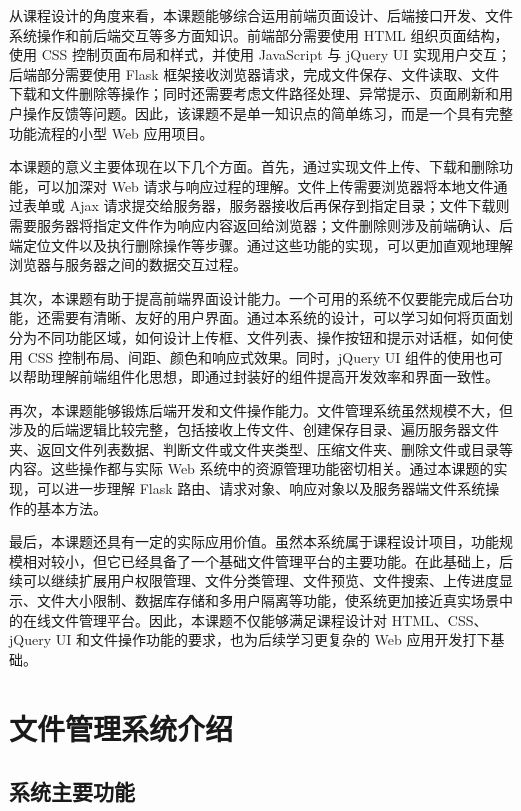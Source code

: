 \documentclass[UTF8,zihao=-4]{ctexrep}
\begin{document}
从课程设计的角度来看，本课题能够综合运用前端页面设计、后端接口开发、文件系统操作和前后端交互等多方面知识。前端部分需要使用 HTML 组织页面结构，使用 CSS 控制页面布局和样式，并使用 JavaScript 与 jQuery UI 实现用户交互；后端部分需要使用 Flask 框架接收浏览器请求，完成文件保存、文件读取、文件下载和文件删除等操作；同时还需要考虑文件路径处理、异常提示、页面刷新和用户操作反馈等问题。因此，该课题不是单一知识点的简单练习，而是一个具有完整功能流程的小型 Web 应用项目。

本课题的意义主要体现在以下几个方面。首先，通过实现文件上传、下载和删除功能，可以加深对 Web 请求与响应过程的理解。文件上传需要浏览器将本地文件通过表单或 Ajax 请求提交给服务器，服务器接收后再保存到指定目录；文件下载则需要服务器将指定文件作为响应内容返回给浏览器；文件删除则涉及前端确认、后端定位文件以及执行删除操作等步骤。通过这些功能的实现，可以更加直观地理解浏览器与服务器之间的数据交互过程。

其次，本课题有助于提高前端界面设计能力。一个可用的系统不仅要能完成后台功能，还需要有清晰、友好的用户界面。通过本系统的设计，可以学习如何将页面划分为不同功能区域，如何设计上传框、文件列表、操作按钮和提示对话框，如何使用 CSS 控制布局、间距、颜色和响应式效果。同时，jQuery UI 组件的使用也可以帮助理解前端组件化思想，即通过封装好的组件提高开发效率和界面一致性。

再次，本课题能够锻炼后端开发和文件操作能力。文件管理系统虽然规模不大，但涉及的后端逻辑比较完整，包括接收上传文件、创建保存目录、遍历服务器文件夹、返回文件列表数据、判断文件或文件夹类型、压缩文件夹、删除文件或目录等内容。这些操作都与实际 Web 系统中的资源管理功能密切相关。通过本课题的实现，可以进一步理解 Flask 路由、请求对象、响应对象以及服务器端文件系统操作的基本方法。

最后，本课题还具有一定的实际应用价值。虽然本系统属于课程设计项目，功能规模相对较小，但它已经具备了一个基础文件管理平台的主要功能。在此基础上，后续可以继续扩展用户权限管理、文件分类管理、文件预览、文件搜索、上传进度显示、文件大小限制、数据库存储和多用户隔离等功能，使系统更加接近真实场景中的在线文件管理平台。因此，本课题不仅能够满足课程设计对 HTML、CSS、jQuery UI 和文件操作功能的要求，也为后续学习更复杂的 Web 应用开发打下基础。

\section{文件管理系统介绍}

\subsection{系统主要功能}
\end{document}
